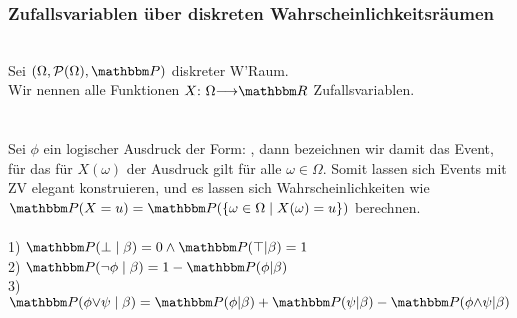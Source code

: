 \subsubsection*{Zufallsvariablen über diskreten Wahrscheinlichkeitsräumen}
 \\
Sei \((\Omega, \pro(\Omega), \Pro)\) diskreter W'Raum. \\
Wir nennen alle Funktionen \(X\QDp \Omega {\longrightarrow} \R\) Zufallsvariablen. \\ \\
 \\
Sei \(\phi\) ein logischer Ausdruck der Form: , dann bezeichnen wir damit das Event, für das für \(X(\omega)\) der Ausdruck gilt für alle \(\omega \in \Omega\). Somit lassen sich Events mit ZV elegant konstruieren, und es lassen sich Wahrscheinlichkeiten wie \(\Pro(X = u) = \Pro(\{{\omega \in \Omega} \mid {X(\omega) = u}\})\) berechnen. \pagebreak \\
 \\
1) \(\Pro(\bot \mid \beta) = 0 \wedge \Pro(\top|\beta) = 1\) \\
2) \(\Pro(\neg\phi \mid \beta) = 1 - \Pro(\phi|\beta)\) \\
3) \(\Pro(\phi {\vee} \psi \mid \beta) = \Pro(\phi| \beta) + \Pro(\psi| \beta) - \Pro(\phi {\wedge} \psi| \beta)\)
